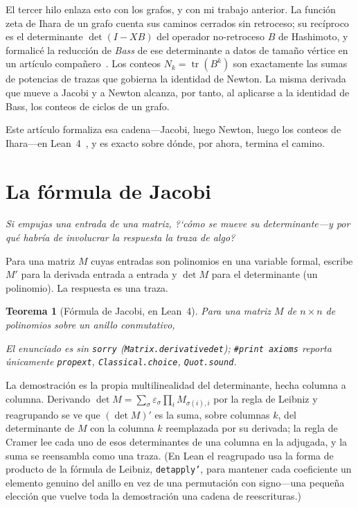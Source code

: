 \documentclass[11pt]{article}
\newtheorem{theorem}{Teorema}
\newcommand{\lean}[1]{{\def\_{\textunderscore\allowbreak}\texttt{#1}}}
\newcommand{\tr}{\operatorname{tr}}
\newcommand{\adj}{\operatorname{adj}}
\newcommand{\keyeq}[1]{\begin{center}\keybox{$\displaystyle #1$}\end{center}}
\begin{document}
El tercer hilo enlaza esto con los grafos, y con mi trabajo anterior. La funci\'on zeta de Ihara de
un grafo cuenta sus caminos cerrados sin retroceso; su rec\'iproco es el determinante $\det(I-XB)$
del operador no-retroceso $B$ de Hashimoto, y formalic\'e la reducci\'on de \emph{Bass} de ese
determinante a datos de tama\~no v\'ertice en un art\'iculo compa\~nero~\cite{IharaBass}. Los conteos
$N_k=\tr(B^k)$ son exactamente las sumas de potencias de trazas que gobierna la identidad de Newton.
La misma derivada que mueve a Jacobi y a Newton alcanza, por tanto, al aplicarse a la identidad de
Bass, los conteos de ciclos de un grafo.

Este art\'iculo formaliza esa cadena---Jacobi, luego Newton, luego los conteos de Ihara---en Lean~4~\cite{LeanFour}, y
es exacto sobre d\'onde, por ahora, termina el camino.

\section{La f\'ormula de Jacobi}
\label{sec:jacobi}

\emph{Si empujas una entrada de una matriz, ?`c\'omo se mueve su determinante---y por qu\'e habr\'ia
de involucrar la respuesta la traza de algo?}

Para una matriz $M$ cuyas entradas son polinomios en una variable formal, escribe $M'$ para la
derivada entrada a entrada y $\det M$ para el determinante (un polinomio). La respuesta es una traza.

\begin{theorem}[F\'ormula de Jacobi, en Lean~4]
\label{thm:jacobi}
Para una matriz $M$ de $n\times n$ de polinomios sobre un anillo conmutativo,
\keyeq{(\det M)'\;=\;\tr\!\bigl(\adj M\cdot M'\bigr).}
El enunciado es sin \lean{sorry} (\lean{Matrix.derivative\_det}); \lean{\#print axioms} reporta
\'unicamente \lean{propext}, \lean{Classical.choice}, \lean{Quot.sound}.
\end{theorem}

La demostraci\'on es la propia multilinealidad del determinante, hecha columna a columna. Derivando
$\det M=\sum_\sigma\varepsilon_\sigma\prod_i M_{\sigma(i),i}$ por la regla de Leibniz y reagrupando se
ve que $(\det M)'$ es la suma, sobre columnas $k$, del determinante de $M$ con la columna $k$
reemplazada por su derivada; la regla de Cramer lee cada uno de esos determinantes de una columna en
la adjugada, y la suma se reensambla como una traza. (En Lean el reagrupado usa la forma de producto
de la f\'ormula de Leibniz, \lean{det\_apply'}, para mantener cada coeficiente un elemento genuino del
anillo en vez de una permutaci\'on con signo---una peque\~na elecci\'on que vuelve toda la
demostraci\'on una cadena de reescrituras.)
\end{document}
